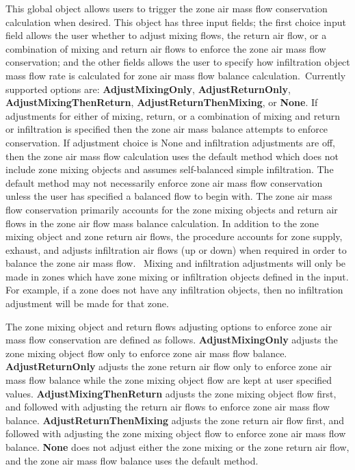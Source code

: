 This global object allows users to trigger the zone air mass flow conservation calculation when desired. This object has three input fields; the first choice input field allows the user whether to adjust mixing flows, the return air flow, or a combination of mixing and return air flows to enforce the zone air mass flow conservation; and the other fields allows the user to specify how infiltration object mass flow rate is calculated for zone air mass flow balance calculation.~Currently supported options are: \textbf{AdjustMixingOnly}, \textbf{AdjustReturnOnly}, \textbf{AdjustMixingThenReturn}, \textbf{AdjustReturnThenMixing}, or \textbf{None}. If adjustments for either of mixing, return, or a combination of mixing and return or infiltration is specified then the zone air mass balance attempts to enforce conservation. If adjustment choice is None and infiltration adjustments are off, then the zone air mass flow calculation uses the default method which does not include zone mixing objects and assumes self-balanced simple infiltration. The default method may not necessarily enforce zone air mass flow conservation unless the user has specified a balanced flow to begin with. The zone air mass flow conservation primarily accounts for the zone mixing objects and return air flows in the zone air flow mass balance calculation. In addition to the zone mixing object and zone return air flows, the procedure accounts for zone supply, exhaust, and adjusts infiltration air flows (up or down) when required in order to balance the zone air mass flow.~ Mixing and infiltration adjustments will only be made in zones which have zone mixing or infiltration objects defined in the input. For example, if a zone does not have any infiltration objects, then no infiltration adjustment will be made for that zone. 

The zone mixing object and return flows adjusting options to enforce zone air mass flow conservation are defined as follows. \textbf{AdjustMixingOnly} adjusts the zone mixing object flow only to enforce zone air mass flow balance. \textbf{AdjustReturnOnly} adjusts the zone return air flow only to enforce zone air mass flow balance while the zone mixing object flow are kept at user specified values. \textbf{AdjustMixingThenReturn} adjusts the zone mixing object flow first, and followed with adjusting the return air flows to enforce zone air mass flow balance. \textbf{AdjustReturnThenMixing} adjusts the zone return air flow first, and followed with adjusting the zone mixing object flow to enforce zone air mass flow balance. \textbf{None} does not adjust either the zone mixing or the zone return air flow, and the zone air mass flow balance uses the default method. 
 
